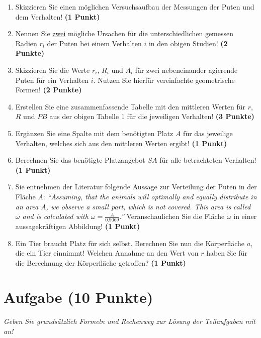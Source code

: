 \documentclass[a4paper, 9pt]{scrartcl}\usepackage[]{graphicx}\usepackage[]{xcolor}
\begin{document}
\begin{enumerate}
\item Skizzieren Sie einen möglichen Versuchsaufbau der Messungen der Puten und dem Verhalten! \textbf{(1 Punkt)} 
\item Nennen Sie \uline{zwei} mögliche Ursachen für die unterschiedlichen gemessen Radien $r_i$ der Puten bei einem Verhalten $i$ in den obigen Studien! \textbf{(2 Punkte)}
\item Skizzieren Sie die Werte $r_i$, $R_i$ und $A_i$ für zwei nebeneinander agierende Puten für ein Verhalten $i$. Nutzen Sie hierfür vereinfachte geometrische Formen! \textbf{(2 Punkte)}
\item Erstellen Sie eine zusammenfassende Tabelle mit den mittleren Werten für $r$, $R$ und $PB$ aus der obigen Tabelle 1 für die jeweiligen Verhalten! \textbf{(3 Punkte)}
\item Ergänzen Sie eine Spalte mit dem benötigten Platz $A$ für das jeweilige Verhalten, welches sich aus den mittleren Werten ergibt! \textbf{(1 Punkt)}
\item Berechnen Sie das benötigte Platzangebot $SA$ für alle betrachteten Verhalten! \textbf{(1 Punkt)}
\item Sie entnehmen der Literatur folgende Aussage zur Verteilung der Puten in der Fläche $A$: \textit{"`Assuming, that the animals will optimally and equally distribute in an area $A$, we observe a
    small part, which is not covered. This area is called $\omega$ and is calculated with $\omega = \tfrac{A}{0.9069}$."'} Veranschaulichen Sie die Fläche $\omega$ in einer aussagekräftigen Abbildung!  \textbf{(1 Punkt)}
\item Ein Tier braucht Platz für sich selbst. Berechnen Sie nun die Körperfläche $a$, die ein Tier einnimmt! Welchen Annahme an den Wert von $r$ haben Sie für die Berechnung der Körperfläche getroffen? \textbf{(1 Punkt)}
\end{enumerate}



 
\clearpage

\section{Aufgabe \hfill (10 Punkte)}

\textit{Geben Sie grundsätzlich Formeln und Rechenweg zur Lösung der Teilaufgaben mit an!} \\[1Ex]
 
\end{document}
